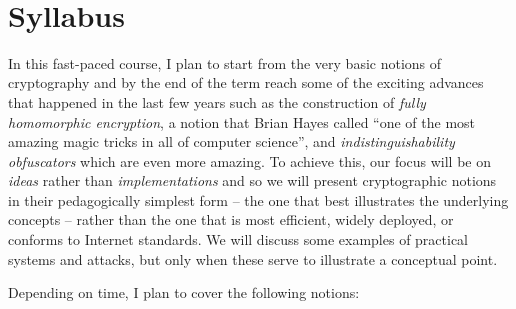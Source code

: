 ~

\section{Syllabus}\label{p-Syllabus}

In this fast-paced course, I plan to start from the very basic notions
of cryptography and by the end of the term reach some of the exciting
advances that happened in the last few years such as the construction of
\emph{fully homomorphic encryption}, a notion that Brian Hayes called
``one of the most amazing magic tricks in all of computer science'', and
\emph{indistinguishability obfuscators} which are even more amazing. To
achieve this, our focus will be on \emph{ideas} rather than
\emph{implementations} and so we will present cryptographic notions in
their pedagogically simplest form -- the one that best illustrates the
underlying concepts -- rather than the one that is most efficient,
widely deployed, or conforms to Internet standards. We will discuss some
examples of practical systems and attacks, but only when these serve to
illustrate a conceptual point.

Depending on time, I plan to cover the following notions:

